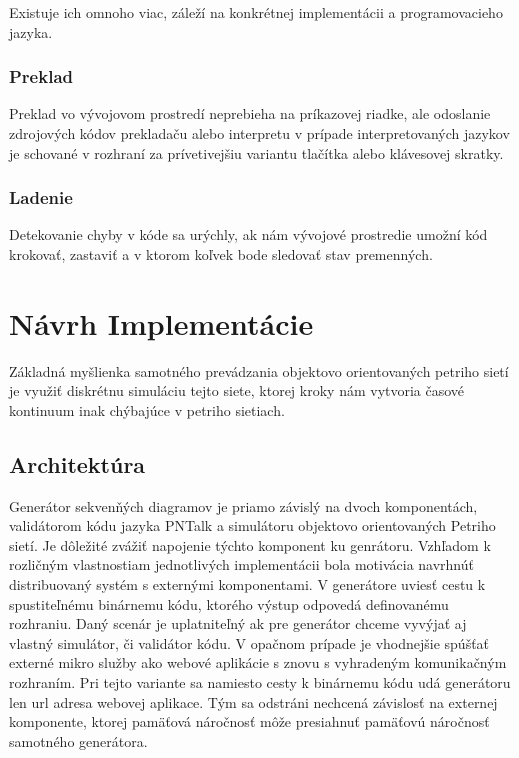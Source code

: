 	Existuje ich omnoho viac, záleží na konkrétnej implementácii a programovacieho jazyka.
	
	\subsection{Preklad}
	Preklad vo vývojovom prostredí neprebieha na príkazovej riadke, ale odoslanie zdrojových kódov prekladaču alebo interpretu v prípade interpretovaných jazykov je schované v rozhraní za prívetivejšiu variantu tlačítka alebo klávesovej skratky.
	
	\subsection{Ladenie}
	Detekovanie chyby v kóde sa urýchly, ak nám vývojové prostredie umožní kód krokovať, zastaviť a v ktorom koľvek bode sledovať stav premenných.



\chapter{Návrh Implementácie}

Základná myšlienka samotného prevádzania objektovo orientovaných petriho sietí je využiť diskrétnu simuláciu tejto siete, ktorej kroky nám vytvoria časové kontinuum inak chýbajúce v petriho sietiach. 

\section{Architektúra}

Generátor sekvenňých diagramov\cite{Analysis2012} je priamo závislý na dvoch komponentách, validátorom kódu jazyka PNTalk a simulátoru objektovo orientovaných Petriho sietí. Je dôležité zvážiť napojenie týchto komponent ku genrátoru. Vzhľadom k rozličným vlastnostiam jednotlivých implementácii bola motivácia navrhnúť distribuovaný systém s externými komponentami. V generátore uviesť cestu k spustiteľnému binárnemu kódu, ktorého výstup odpovedá definovanému rozhraniu. Daný scenár je uplatniteľný ak pre generátor chceme vyvýjať aj vlastný simulátor, či validátor kódu. V opačnom prípade je vhodnejšie spúšťať externé mikro služby ako webové aplikácie s znovu s vyhradeným komunikačným rozhraním. Pri tejto variante sa namiesto cesty k binárnemu kódu udá generátoru len url adresa webovej aplikace. Tým sa odstráni nechcená závislosť na externej komponente, ktorej pamäťová náročnosť môže presiahnuť pamäťovú náročnosť samotného generátora.

